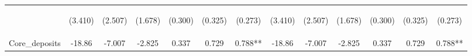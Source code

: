 \documentclass[]{article}
\begin{document}
\begin{center}
\begin{tabular}{lcccccccccccc}
\vspace{4pt} & \begin{footnotesize}(3.410)\end{footnotesize} & \begin{footnotesize}(2.507)\end{footnotesize} & \begin{footnotesize}(1.678)\end{footnotesize} & \begin{footnotesize}(0.300)\end{footnotesize} & \begin{footnotesize}(0.325)\end{footnotesize} & \begin{footnotesize}(0.273)\end{footnotesize} & \begin{footnotesize}(3.410)\end{footnotesize} & \begin{footnotesize}(2.507)\end{footnotesize} & \begin{footnotesize}(1.678)\end{footnotesize} & \begin{footnotesize}(0.300)\end{footnotesize} & \begin{footnotesize}(0.325)\end{footnotesize} & \begin{footnotesize}(0.273)\end{footnotesize} \\
Core\_deposits & -18.86 & -7.007 & -2.825 & 0.337 & 0.729 & 0.788** & -18.86 & -7.007 & -2.825 & 0.337 & 0.729 & 0.788** \\

\end{tabular}
\end{center}
\end{document}
